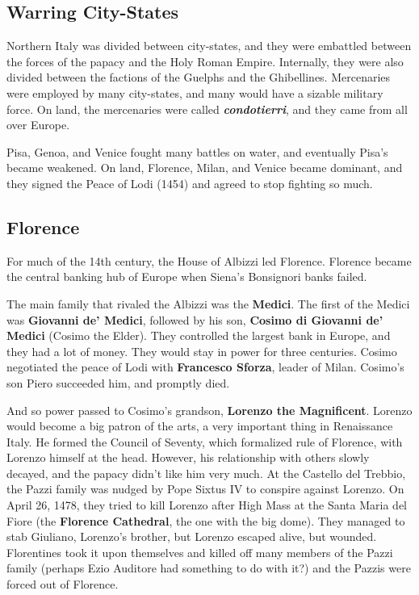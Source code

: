 \subsection*{Warring City-States}

Northern Italy was divided between city-states,
and they were embattled between the forces of the papacy and the Holy Roman Empire.
Internally, they were also divided between the factions of the Guelphs and the Ghibellines.
Mercenaries were employed by many city-states, and many would have a sizable military force.
On land, the mercenaries were called \textit{\textbf{condotierri}}, and they came from all over Europe.

Pisa, Genoa, and Venice fought many battles on water, and eventually Pisa's became weakened.
On land, Florence, Milan, and Venice became dominant,
and they signed the Peace of Lodi (1454) and agreed to stop fighting so much.

\subsection*{Florence}

For much of the 14th century, the House of Albizzi led Florence.
Florence became the central banking hub of Europe when Siena's Bonsignori banks failed.

The main family that rivaled the Albizzi was the \textbf{Medici}.
The first of the Medici was \textbf{Giovanni de' Medici},
followed by his son, \textbf{Cosimo di Giovanni de' Medici} (Cosimo the Elder).
They controlled the largest bank in Europe, and they had a lot of money.
They would stay in power for three centuries.
Cosimo negotiated the peace of Lodi with \textbf{Francesco Sforza}, leader of Milan.
Cosimo's son Piero succeeded him, and promptly died.

And so power passed to Cosimo's grandson, \textbf{Lorenzo the Magnificent}.
Lorenzo would become a big patron of the arts, a very important thing in Renaissance Italy.
He formed the Council of Seventy, which formalized rule of Florence, with Lorenzo himself at the head.
However, his relationship with others slowly decayed, and the papacy didn't like him very much.
At the Castello del Trebbio, the Pazzi family was nudged by Pope Sixtus IV to conspire against Lorenzo.
On April 26, 1478, they tried to kill Lorenzo after High Mass at the Santa Maria del Fiore
(the \textbf{Florence Cathedral}, the one with the big dome).
They managed to stab Giuliano, Lorenzo's brother, but Lorenzo escaped alive, but wounded.
Florentines took it upon themselves and killed off many members of the Pazzi family
(perhaps Ezio Auditore had something to do with it?)
and the Pazzis were forced out of Florence.

